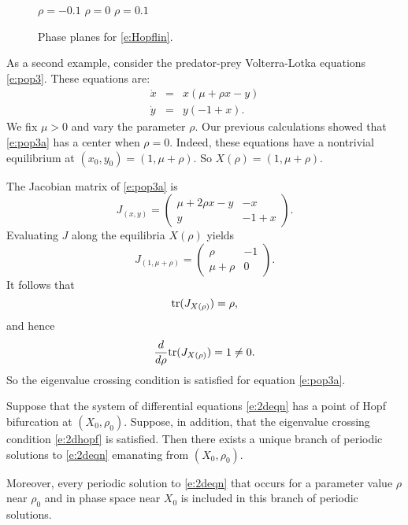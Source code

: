 \documentclass{ximera}
\begin{document}
\begin{figure}[htb]
           \centerline{%
           }
	\vspace*{-0.2in}
	\hspace{0.3in} $\rho=-0.1$  \hspace{1.7in} $\rho=0$
		\hspace{1.8in} $\rho=0.1$ 
           \caption{Phase planes for \protect\eqref{e:Hopflin}.}
           \label{F:Hopfabc}
\end{figure}


As a second example, consider the predator-prey Volterra-Lotka 
equations \eqref{e:pop3}.  These equations are: 
\begin{equation} \label{e:pop3a}
\begin{array}{rcl}
\dot{x} & = & x(\mu + \rho x -       y) \\
\dot{y} & = & y( -1 +       x).
\end{array}
\end{equation}   
We fix $\mu>0$ and vary the parameter $\rho$.  Our previous 
calculations showed that \eqref{e:pop3a} has a center when 
$\rho=0$.  Indeed, these equations have a nontrivial equilibrium 
at $(x_0,y_0)=(1, \mu+\rho)$.  So $X(\rho)=(1,\mu+\rho)$.

The Jacobian matrix of \eqref{e:pop3a} is
\[
J_{(x,y)} = \left(\begin{array}{cc} \mu + 2\rho x - y & -x \\
y & -1 + x \end{array}\right).
\]
Evaluating $J$ along the equilibria $X(\rho)$ yields
\[
J_{(1,\mu+\rho)} = \left(\begin{array}{cc} \rho & -1 \\
\mu+\rho & 0 \end{array}\right).
\]
It follows that
\[
{\rm tr}(J_{X(\rho)}) = \rho,
\]
and hence 
\[
\frac{d}{d\rho} {\rm tr}(J_{X(\rho)}) = 1 \neq 0.
\]
So the eigenvalue crossing condition is satisfied for equation 
\eqref{e:pop3a}.  

\begin{theorem}  \label{T:2dhopf}
Suppose that the system of differential equations \eqref{e:2deqn}
has a point of Hopf bifurcation at $(X_0,\rho_0)$.  Suppose, in 
addition, that the 
eigenvalue crossing 
condition \eqref{e:2dhopf} 
is satisfied.  Then there exists a unique branch of periodic 
solutions to \eqref{e:2deqn} emanating from $(X_0,\rho_0)$. 

Moreover, every periodic solution to \eqref{e:2deqn} that occurs for
a parameter value $\rho$ near $\rho_0$ and in phase space near $X_0$ 
is included in this branch of periodic solutions.
\end{theorem}  
\end{document}
